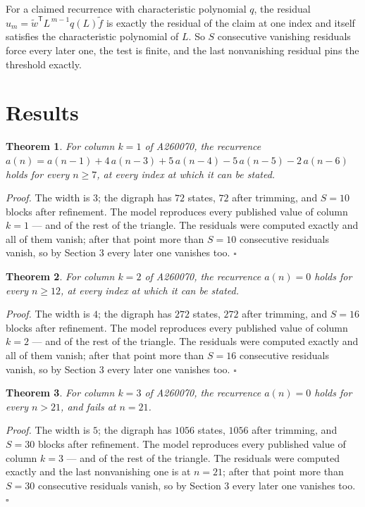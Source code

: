 \documentclass[11pt]{article}
\newtheorem{theorem}{Theorem}
\theoremstyle{definition}
\begin{document}
For a claimed recurrence with characteristic polynomial $q$, the residual $u_m = \tilde w^{\mathsf T}L^{\,m-1}q(L)\tilde f$ is exactly the residual of the claim at one index and itself satisfies the characteristic polynomial of $L$. So $S$ consecutive vanishing residuals force every later one, the test is finite, and the last nonvanishing residual pins the threshold exactly.

\section{Results}

\begin{theorem} For column $k = 1$ of A260070, the recurrence $a(n) = a(n-1) + 4\,a(n-3) + 5\,a(n-4) - 5\,a(n-5) - 2\,a(n-6)$ holds for every $n \ge 7$, at every index at which it can be stated.\end{theorem}

{\itshape Proof.} The width is $3$; the digraph has $72$ states, $72$ after trimming, and $S = 10$ blocks after refinement. The model reproduces every published value of column $k = 1$ --- and of the rest of the triangle. The residuals were computed exactly and all of them vanish; after that point more than $S = 10$ consecutive residuals vanish, so by Section 3 every later one vanishes too. $\square$

\begin{theorem} For column $k = 2$ of A260070, the recurrence $a(n) = 0$ holds for every $n \ge 12$, at every index at which it can be stated.\end{theorem}

{\itshape Proof.} The width is $4$; the digraph has $272$ states, $272$ after trimming, and $S = 16$ blocks after refinement. The model reproduces every published value of column $k = 2$ --- and of the rest of the triangle. The residuals were computed exactly and all of them vanish; after that point more than $S = 16$ consecutive residuals vanish, so by Section 3 every later one vanishes too. $\square$

\begin{theorem} For column $k = 3$ of A260070, the recurrence $a(n) = 0$ holds for every $n > 21$, and fails at $n = 21$.\end{theorem}

{\itshape Proof.} The width is $5$; the digraph has $1056$ states, $1056$ after trimming, and $S = 30$ blocks after refinement. The model reproduces every published value of column $k = 3$ --- and of the rest of the triangle. The residuals were computed exactly and the last nonvanishing one is at $n = 21$; after that point more than $S = 30$ consecutive residuals vanish, so by Section 3 every later one vanishes too. $\square$
\end{document}

